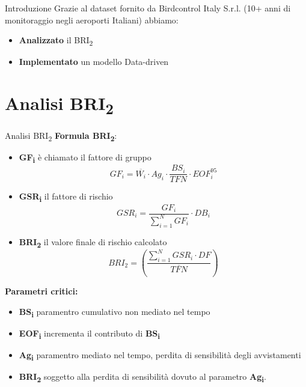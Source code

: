 \documentclass[10pt]{beamer}
\begin{document}
\begin{frame}{Introduzione}
Grazie al dataset fornito da Birdcontrol Italy S.r.l. (10+ anni di monitoraggio negli aeroporti Italiani) abbiamo:%
\begin{itemize}
    \item \textbf{Analizzato} il BRI\textsubscript{2}
    \item \textbf{Implementato} un modello Data-driven 
\end{itemize}
\end{frame}


\section{Analisi BRI\textsubscript{2}}

\begin{frame}{Analisi BRI\textsubscript{2}}
\textbf{Formula BRI\textsubscript{2}}:

\begin{itemize}
    \item \textbf{GF\textsubscript{i}} è chiamato il fattore di gruppo {{\scriptsize\begin{equation}\label{GF}
GF_i=\overline{W_i}\cdot Ag_i \cdot\frac{BS_i}{TFN} \cdot EOF_i ^{95}\end{equation}}\small}
    \item \textbf{GSR\textsubscript{i}} il fattore di rischio {{\scriptsize\begin{equation}\label{GSR}
GSR_i=\frac{GF_i}{\sum_{i=1}^{N}GF_i}\cdot DB_i
\end{equation}}\small}
    \item \textbf{BRI\textsubscript{2}} il valore finale di rischio calcolato {{\scriptsize\begin{equation}\label{BRI2_f}
BRI_2=\left(\frac{\sum_{i=1}^{N}GSR_i \cdot DF}{\overline{TFN}}\right)
\end{equation}}\small}
\end{itemize}

\textbf{Parametri critici:}
\begin{itemize}
    \item \textbf{BS\textsubscript{i}} paramentro cumulativo non mediato nel tempo
    \item \textbf{EOF\textsubscript{i}} incrementa il contributo di \textbf{BS\textsubscript{i}}
    \item \textbf{Ag\textsubscript{i}} paramentro mediato nel tempo, perdita di sensibilità degli avvistamenti
    \item \textbf{BRI\textsubscript{2}} soggetto alla perdita di sensibilità dovuto al parametro \textbf{Ag\textsubscript{i}}.
\end{itemize}
\end{frame}
\end{document}
